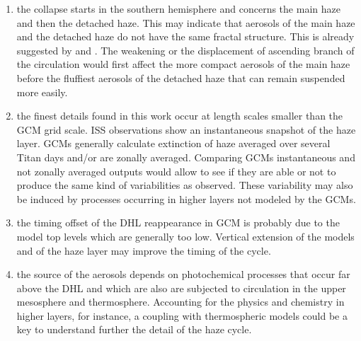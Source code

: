 \begin{enumerate}
\item the collapse starts in the southern hemisphere and concerns the main haze and then the detached haze. This
may indicate that aerosols of the main haze and the detached haze do not have the same fractal structure. This is
already suggested by \cite{Lavvas2009} and \cite{Larson2015}.
The weakening or the displacement of ascending branch of the circulation would first affect the more
compact aerosols of the main haze before the fluffiest aerosols of the detached haze that can remain suspended more
easily.
\item the finest details found in this work occur at length scales smaller than the GCM grid scale.
ISS observations show an instantaneous snapshot of the haze layer. GCMs generally
calculate extinction of haze averaged over several Titan days and/or are zonally averaged. Comparing GCMs instantaneous and
not zonally averaged outputs would allow to see if they are able or not to produce the same kind of variabilities as
observed. These variability may also be induced by processes occurring in higher layers not modeled by the GCMs.
\item the timing offset of the DHL reappearance in GCM is probably due to the model top levels which are generally too
low. Vertical extension of the models and of the haze layer may improve the timing of the cycle.
\item the source of the aerosols depends on photochemical processes that occur far above the DHL and which are
also are subjected to circulation in the upper mesosphere and thermosphere.
Accounting for the physics and chemistry in higher layers, for instance, a coupling with thermospheric models could
be a key to understand further the detail of the haze cycle.
\end{enumerate}
